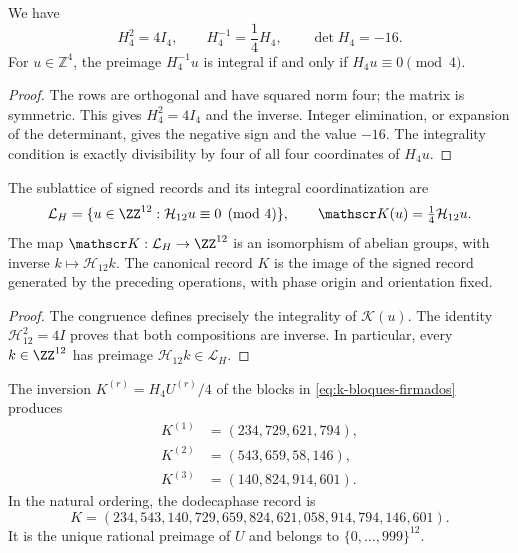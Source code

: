 \begin{lemma}
\label{lem:k-hadamard}
We have
\[
 H_4^2=4I_4,\qquad H_4^{-1}=\frac14H_4,\qquad\det H_4=-16.
\]
For \(u\in\mathbb Z^4\), the preimage \(H_4^{-1}u\) is integral if and
only if \(H_4u\equiv0\pmod4\).
\end{lemma}

\begin{proof}
The rows are orthogonal and have squared norm four; the matrix is
symmetric. This gives \(H_4^2=4I_4\) and the inverse. Integer elimination,
or expansion of the determinant, gives the negative sign and the value \(-16\).
The integrality condition is exactly divisibility by four
of all four coordinates of \(H_4u\).
\end{proof}

\begin{definition}
The sublattice of signed records and its integral coordinatization are
\[
 \mathcal L_H=\{u\in\ZZ^{12}:\mathcal H_{12}u\equiv0\pmod4\},
 \qquad \mathscr K(u)=\tfrac14\mathcal H_{12}u.
\]
The map \(\mathscr K:\mathcal L_H\to\ZZ^{12}\) is an isomorphism
of abelian groups, with inverse \(k\mapsto\mathcal H_{12}k\).
The canonical record \(K\) is the image of the signed record generated
by the preceding operations, with phase origin and orientation fixed.
\end{definition}

\begin{proof}
The congruence defines precisely the integrality of \(\mathscr K(u)\).
The identity \(\mathcal H_{12}^2=4I\) proves that both compositions
are inverse. In particular, every \(k\in\ZZ^{12}\) has preimage
\(\mathcal H_{12}k\in\mathcal L_H\).
\end{proof}

\begin{proposition}
\label{prop:k-sello}
The inversion \(K^{(r)}=H_4U^{(r)}/4\) of the blocks in
\eqref{eq:k-bloques-firmados} produces
\begin{align*}
 K^{(1)}&=(234,729,621,794),\\
 K^{(2)}&=(543,659,58,146),\\
 K^{(3)}&=(140,824,914,601).
\end{align*}
In the natural ordering, the dodecaphase record is
\begin{equation}
 K=(234,543,140,729,659,824,621,058,914,794,146,601).
 \label{eq:k-vector}
\end{equation}
It is the unique rational preimage of \(U\) and belongs to
\(\{0,\ldots,999\}^{12}\).
\end{proposition}

